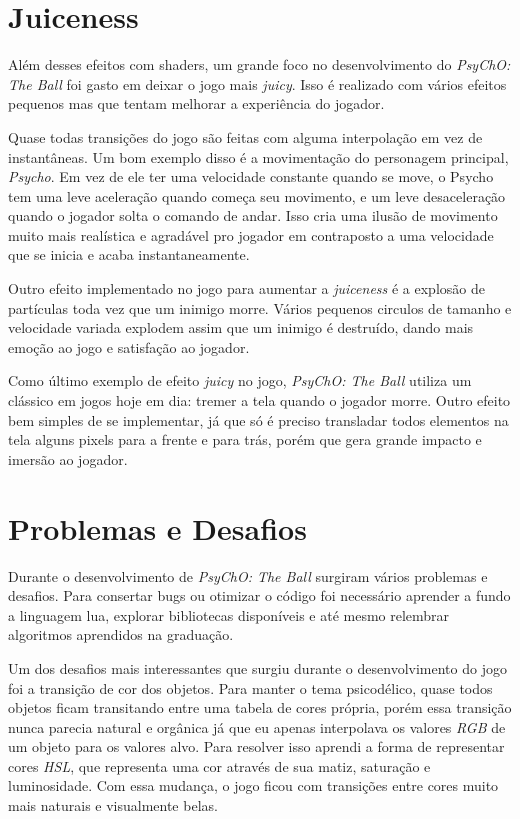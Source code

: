 \section{Juiceness}
\label{sec:juiceness}

Além desses efeitos com shaders, um grande foco no desenvolvimento do \textit{PsyChO: The Ball} foi gasto em deixar o jogo mais \textit{juicy}. Isso é realizado com vários efeitos pequenos mas que tentam melhorar a experiência do jogador.

Quase todas transições do jogo são feitas com alguma interpolação em vez de instantâneas. Um bom exemplo disso é a movimentação do personagem principal, \textit{Psycho}. Em vez de ele ter uma velocidade constante quando se move, o Psycho tem uma leve aceleração quando começa seu movimento, e um leve desaceleração quando o jogador solta o comando de andar. Isso cria uma ilusão de movimento muito mais realística e agradável pro jogador em contraposto a uma velocidade que se inicia e acaba instantaneamente.

Outro efeito implementado no jogo para aumentar a \textit{juiceness} é a explosão de partículas toda vez que um inimigo morre. Vários pequenos circulos de tamanho e velocidade variada explodem assim que um inimigo é destruído, dando mais emoção ao jogo e satisfação ao jogador.

Como último exemplo de efeito \textit{juicy} no jogo, \textit{PsyChO: The Ball} utiliza um clássico em jogos hoje em dia: tremer a tela quando o jogador morre. Outro efeito bem simples de se implementar, já que só é preciso transladar todos elementos na tela alguns pixels para a frente e para trás, porém que gera grande impacto e imersão ao jogador.

\section{Problemas e Desafios}
\label{sec:problemas_e_desafios}

Durante o desenvolvimento de \textit{PsyChO: The Ball} surgiram vários problemas e desafios. Para consertar bugs ou otimizar o código foi necessário aprender a fundo a linguagem lua, explorar bibliotecas disponíveis e até mesmo relembrar algoritmos aprendidos na graduação.

Um dos desafios mais interessantes que surgiu durante o desenvolvimento do jogo foi a transição de cor dos objetos. Para manter o tema psicodélico, quase todos objetos ficam transitando entre uma tabela de cores própria, porém essa transição nunca parecia natural e orgânica já que eu apenas interpolava os valores \textit{RGB} de um objeto para os valores alvo. Para resolver isso aprendi a forma de representar cores \textit{HSL}, que representa uma cor através de sua matiz, saturação e luminosidade. Com essa mudança, o jogo ficou com transições entre cores muito mais naturais e visualmente belas.
